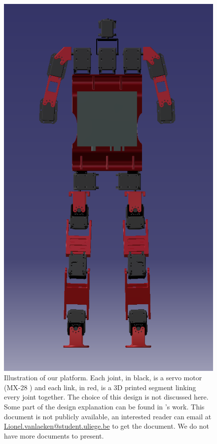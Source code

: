 \documentclass[12pt,a4paper]{report}
\begin{document}
\begin{figure}[h]
  \begin{minipage}[c]{0.3\textwidth}
    \includegraphics[width=\textwidth]{figs/platform.png}
  \end{minipage}\hfill
  \begin{minipage}[c]{0.6\textwidth}
    \caption{Illustration of our platform. Each joint, in black, is a servo motor (MX-28 \cite{MX28}) and each link, in red, is a 3D printed segment linking every joint together. The choice of this design is not discussed here. Some part of the design explanation can be found in 
    \cite{VanLaeken}'s work. This document is not publicly available, an interested reader can email at \cite{VanLaeken} \href{mailto:Lionel.vanlaeken@student.uliege.be}{Lionel.vanlaeken@student.uliege.be} to get the document. We do not have more documents to present.}
    \label{fig:platform}
  \end{minipage}
\end{figure}
\end{document}
